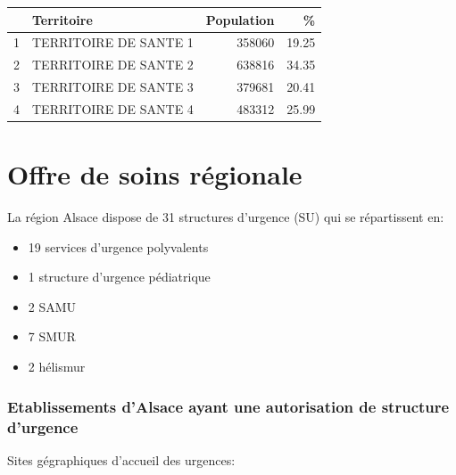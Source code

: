 \documentclass[]{article}
\begin{document}
\begin{table}[ht]
\centering
\begin{tabular}{rlrr}
  \hline
 & Territoire & Population & \% \\ 
  \hline
1 & TERRITOIRE DE SANTE 1 & 358060 & 19.25 \\ 
  2 & TERRITOIRE DE SANTE 2 & 638816 & 34.35 \\ 
  3 & TERRITOIRE DE SANTE 3 & 379681 & 20.41 \\ 
  4 & TERRITOIRE DE SANTE 4 & 483312 & 25.99 \\ 
   \hline
\end{tabular}
\end{table}

\section{Offre de soins régionale}\label{offre-de-soins-regionale}

La région Alsace dispose de 31 structures d'urgence (SU) qui se
répartissent en:

\begin{itemize}
\itemsep1pt\parskip0pt
\item
  19 services d'urgence polyvalents
\item
  1 structure d'urgence pédiatrique
\item
  2 SAMU
\item
  7 SMUR
\item
  2 hélismur
\end{itemize}

\subsubsection{Etablissements d'Alsace ayant une autorisation de
structure
d'urgence}\label{etablissements-dalsace-ayant-une-autorisation-de-structure-durgence}

Sites gégraphiques d'accueil des urgences:
\end{document}
